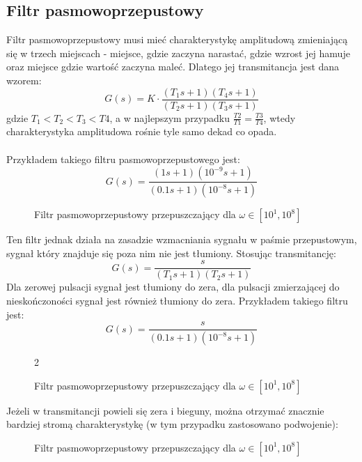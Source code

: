 \documentclass[a4paper, 10pt]{article}
\begin{document}
		\subsection{Filtr pasmowoprzepustowy}
			Filtr pasmowoprzepustowy musi mieć charakterystykę amplitudową zmieniającą się w trzech miejscach - miejsce, gdzie zaczyna narastać, gdzie wzrost jej hamuje oraz miejsce gdzie wartość zaczyna maleć. Dlatego jej transmitancja jest dana wzorem:
			$$
				G(s) = K\cdot\frac{(T_1 s + 1)(T_4 s + 1)}{(T_2 s + 1)(T_3 s + 1)}
			$$
			gdzie $T_1 < T_2 < T_3 < T4$, a w najlepszym przypadku $\frac{T2}{T1} = \frac{T3}{T4}$, wtedy charakterystyka amplitudowa rośnie tyle samo dekad co opada.
			\\ \\
			Przykładem takiego filtru pasmowoprzepustowego jest:
			$$
				G(s) = \frac{(1 s + 1)(10^{-9} s + 1)}{(0.1 s + 1)(10^{-8} s + 1)}
			$$
			\begin{figure}[H]
				\centering
				\def \svgwidth{0.7\columnwidth}
				
				\caption{Filtr pasmowoprzepustowy przepuszczający dla $\omega \in [10^1, 10^8]$}
			\end{figure}\noindent
			Ten filtr jednak działa na zasadzie wzmacniania sygnału w paśmie przepustowym, sygnał który znajduje się poza nim nie jest tłumiony. Stosując transmitancję:
			$$
				G(s) = \frac{s}{(T_1 s + 1)(T_2 s + 1)}
			$$
			Dla zerowej pulsacji sygnał jest tłumiony do zera, dla pulsacji zmierzającej do nieskończoności sygnał jest również tłumiony do zera. Przykładem takiego filtru jest:
			$$
				G(s) = \frac{s}{(0.1 s + 1)(10^{-8} s + 1)}
			$$
			\begin{figure}[H]2
				\centering
				\def \svgwidth{0.7\columnwidth}
				
				\caption{Filtr pasmowoprzepustowy przepuszczający dla $\omega \in [10^1, 10^8]$}
			\end{figure}\noindent
			Jeżeli w transmitancji powieli się zera i bieguny, można otrzymać znacznie bardziej stromą charakterystykę (w tym przypadku zastosowano podwojenie):
			\begin{figure}[H]
				\centering
				\def \svgwidth{0.7\columnwidth}
				
				\caption{Filtr pasmowoprzepustowy przepuszczający dla $\omega \in [10^1, 10^8]$}
			\end{figure}\noindent
\end{document}
